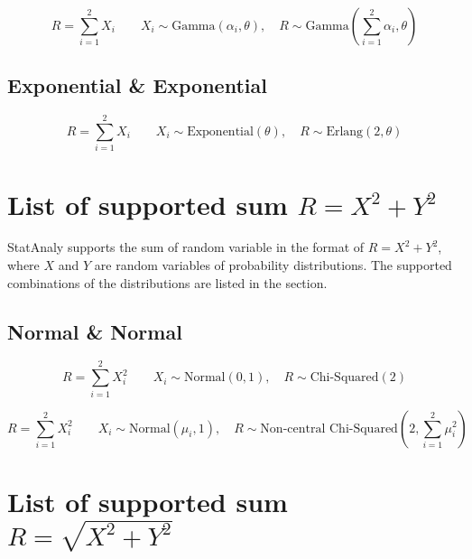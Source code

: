     \begin{equation}
        R = \sum_{i=1}^2 X_i \qquad 
        X_i \sim \text{Gamma}(\alpha_i,\theta), \quad 
        R \sim \text{Gamma}\left(\sum _{i=1}^{2}\alpha_{i},\theta \right)
    \end{equation}

\subsection{Exponential \& Exponential}

    \begin{equation}
        R = \sum_{i=1}^2 X_i \qquad 
        X_i \sim \text{Exponential}(\theta), \quad 
        R \sim \text{Erlang}\left(2, \theta \right)
    \end{equation}


\section{List of supported sum $R = X^2 + Y^2$}

StatAnaly supports the sum of random variable in the format of $R = X^2 + Y^2$, where $X$ and $Y$ are random variables of probability distributions.
The supported combinations of the distributions are listed in the section.

\subsection{Normal \& Normal}

\begin{equation}
    R = \sum_{i=1}^2 X_i^2 \qquad 
    X_i \sim \text{Normal}(0,1), \quad 
    R \sim \text{Chi-Squared}\left( 2 \right)
\end{equation}

\begin{equation}
    R = \sum_{i=1}^2 X_i^2 \qquad 
    X_i \sim \text{Normal}(\mu_i,1), \quad 
    R \sim \text{Non-central Chi-Squared}\left(2, \sum _{i=1}^{2}\mu _{i}^2\right)
\end{equation}


\section{List of supported sum $R = \sqrt{X^2 + Y^2}$}


